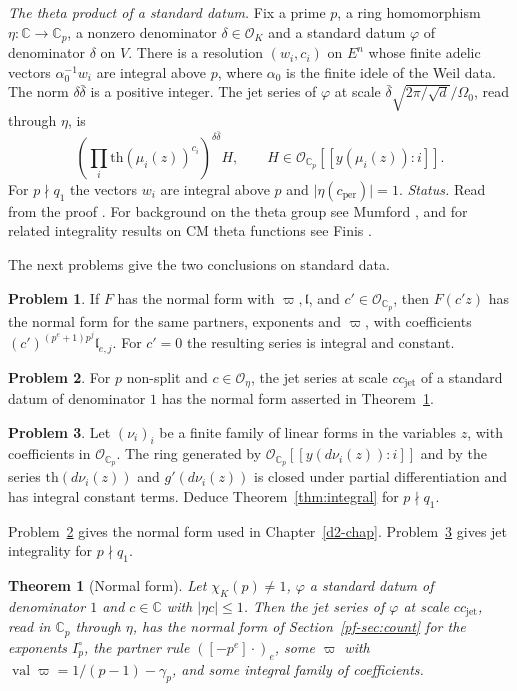 \documentclass[reqno]{amsart}
\newcounter{chap}
\theoremstyle{plain}
\newtheorem{theorem}{Theorem}[section]
\theoremstyle{definition}
\newtheorem{problem}{Problem}[section]
\theoremstyle{remark}
\newcommand{\C}{\mathbb C}
\newcommand{\Oc}{\mathcal O}
\newcommand{\Op}{\mathcal O_{\C_p}}
\newcommand{\val}{\operatorname{val}}
\newcommand{\tth}{\mathrm{th}}
\newcommand{\cjet}{c_{\mathrm{jet}}}
\newcommand{\cper}{c_{\mathrm{per}}}
\begin{document}
\emph{The theta product of a standard datum.}
Fix a prime \(p\), a ring homomorphism \(\eta\colon\C\to\C_p\), a nonzero denominator \(\delta\in\Oc_K\) and a standard datum \(\varphi\) of denominator \(\delta\) on \(V\).  There is a resolution \((w_i,c_i)\) on \(E^n\) whose finite adelic vectors \(\alpha_0^{-1}w_i\) are integral above \(p\), where \(\alpha_0\) is the finite idele of the Weil data.  The norm \(\delta\bar\delta\) is a positive integer.  The jet series of \(\varphi\) at scale \(\bar\delta\sqrt{2\pi/\sqrt d}/\Omega_0\), read through \(\eta\), is
\[
 \left(\prod_i \tth(\mu_i(z))^{c_i}\right)^{\delta\bar\delta} H,
 \qquad H\in\Op[[y(\mu_i(z)):i]].
\]
For \(p\nmid q_1\) the vectors \(w_i\) are integral above \(p\) and \(\lvert\eta(\cper)\rvert=1\).
\emph{Status.} Read from the proof \cite{GL}.  For background on the theta group see Mumford \cite{Mu}, and for related integrality results on CM theta functions see Finis \cite{Fi}.

The next problems give the two conclusions on standard data.

\begin{problem}\label{pr:rescale}
If \(F\) has the normal form with \(\varpi,\mathfrak l\), and \(c'\in\Op\), then \(F(c'z)\) has the normal form for the same partners, exponents and \(\varpi\), with coefficients \((c')^{(p^e+1)p^j}\mathfrak l_{e,j}\).  For \(c'=0\) the resulting series is integral and constant.
\end{problem}

\begin{problem}\label{pr:datum}
For \(p\) non-split and \(c\in\Oc_\eta\), the jet series at scale \(c\cjet\) of a standard datum of denominator \(1\) has the normal form asserted in Theorem~\ref{thm:normal-form}.
\end{problem}

\begin{problem}\label{pr:jet-ring}
Let \((\nu_i)_i\) be a finite family of linear forms in the variables \(z\), with coefficients in \(\Op\).  The ring generated by \(\Op[[y(d\nu_i(z)):i]]\) and by the series \(\tth(d\nu_i(z))\) and \(g'(d\nu_i(z))\) is closed under partial differentiation and has integral constant terms.  Deduce Theorem~\ref{thm:integral} for \(p\nmid q_1\).
\end{problem}

Problem~\ref{pr:datum} gives the normal form used in Chapter~\ref{d2-chap}.  Problem~\ref{pr:jet-ring} gives jet integrality for \(p\nmid q_1\).
\nopagebreak
\begin{theorem}[Normal form]\label{thm:normal-form}
Let \(\chi_K(p) \ne 1\), \(\varphi\) a standard datum of denominator \(1\) and \(c \in \C\) with \(\lvert \eta c \rvert \le 1\).  Then the jet series of \(\varphi\) at scale \(c\cjet\), read in \(\C_p\) through \(\eta\), has the normal form of Section~\ref{pf-sec:count} for the exponents \(I_p^\circ\), the partner rule \(([-p^e]\cdot)_e\), some \(\varpi\) with \(\val \varpi = 1/(p-1) - \gamma_p\), and some integral family of coefficients.
\end{theorem}
\end{document}
